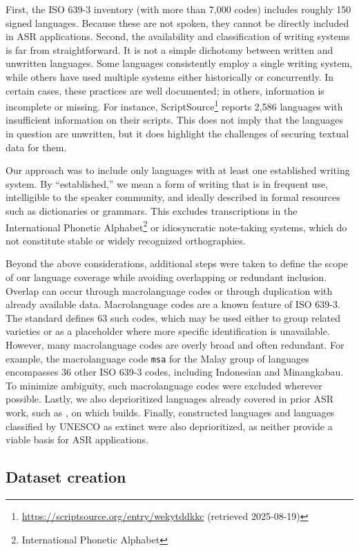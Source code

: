 \documentclass[]{fairmeta}
\begin{document}
First, the ISO 639-3 inventory (with more than 7,000 codes) includes roughly 150 signed languages. Because these are not spoken, they cannot be directly included in ASR applications. Second, the availability and classification of writing systems is far from straightforward. It is not a simple dichotomy between written and unwritten languages. Some languages consistently employ a single writing system, while others have used multiple systems either historically or concurrently. In certain cases, these practices are well documented; in others, information is incomplete or missing. For instance, ScriptSource\footnote{\url{https://scriptsource.org/entry/wekytddkkc} (retrieved 2025-08-19)} reports 2,586 languages with insufficient information on their scripts. This does not imply that the languages in question are unwritten, but it does highlight the challenges of securing textual data for them.

Our approach was to include only languages with at least one established writing system. By “established,” we mean a form of writing that is in frequent use, intelligible to the speaker community, and ideally described in formal resources such as dictionaries or grammars. This excludes transcriptions in the International Phonetic Alphabet\footnote{International Phonetic Alphabet} or idiosyncratic note-taking systems, which do not constitute stable or widely recognized orthographies.

Beyond the above considerations, additional steps were taken to define the scope of our language coverage while avoiding overlapping or redundant inclusion. Overlap can occur through macrolanguage codes or through duplication with already available data. Macrolanguage codes are a known feature of ISO 639-3. The standard defines 63 such codes, which may be used either to group related varieties or as a placeholder where more specific identification is unavailable. However, many macrolanguage codes are overly broad and often redundant. For example, the macrolanguage code \texttt{msa} for the Malay group of languages encompasses 36 other ISO 639-3 codes, including Indonesian and Minangkabau. To minimize ambiguity, such macrolanguage codes were excluded wherever possible. Lastly, we also deprioritized languages already covered in prior ASR work, such as \citet{pratap2024scaling}, on which \OmniASR builds. Finally, constructed languages and languages classified by UNESCO as extinct were also deprioritized, as neither provide a viable basis for ASR applications.

\subsection{Dataset creation}
\end{document}
